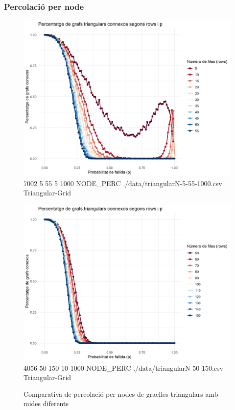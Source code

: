 \documentclass[a4paper]{article}
\begin{document}
	\subsubsection{Percolació per node}
	
	\begin{figure}[H]
		\centering
		\begin{minipage}{0.45\textwidth}
			\centering
			\includegraphics[width=\textwidth]{images/triangularN-5-55-1000}
			\footnotesize{7002 5 55 5 1000 NODE\_PERC ./data/triangularN-5-55-1000.csv Triangular-Grid}
		\end{minipage}
		\hfill
		\begin{minipage}{0.45\textwidth}
			\centering
			\includegraphics[width=\textwidth]{images/triangularE-50-150}
			\footnotesize{4056 50 150 10 1000 NODE\_PERC ./data/triangularN-50-150.csv Triangular-Grid}
		\end{minipage}
		\caption{Comparativa de percolació per nodes de graelles triangulars amb mides diferents}
		\label{fig:percolation_nodes_triangular}
	\end{figure}
	
\end{document}
